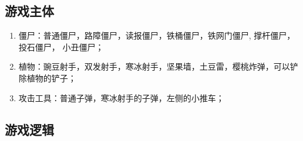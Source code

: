 \documentclass[12pt,a4paper,UTF8]{article}
\begin{document}
    \subsection{游戏主体}
        \begin{enumerate}
          \item 僵尸：普通僵尸，路障僵尸，读报僵尸，铁桶僵尸，铁网门僵尸, 撑杆僵尸，投石僵尸， 小丑僵尸；
          \item 植物：豌豆射手，双发射手，寒冰射手，坚果墙，土豆雷，樱桃炸弹，可以铲除植物的铲子；
          \item 攻击工具：普通子弹，寒冰射手的子弹，左侧的小推车；
        \end{enumerate}

    \subsection{游戏逻辑}
\end{document}
